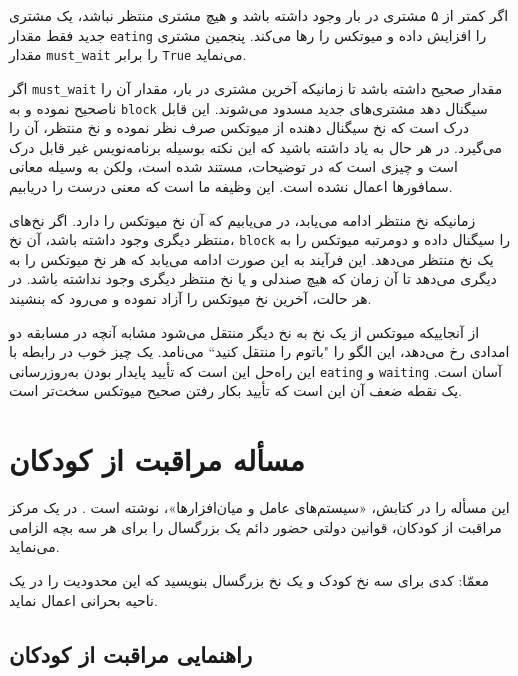 \documentclass{book}
\newcommand{\clearemptydoublepage}{}%
\begin{document}

    اگر کمتر از ۵ مشتری در بار وجود داشته باشد و هیچ مشتری منتظر نباشد، یک مشتری جدید فقط مقدار {\tt eating} را افزایش داده و میوتکس را رها می‌کند. 
    پنجمین مشتری مقدار {\tt must\_wait} را برابر \texttt{True} می‌نماید. 

    اگر {\tt must\_wait} مقدار صحیح داشته باشد تا زمانیکه آخرین مشتری در بار، مقدار آن را ناصحیح نموده و به  {\tt block} سیگنال دهد مشتری‌های جدید 
    مسدود می‌شوند. این قابل درک است که نخ سیگنال دهنده از میوتکس صرف نظر نموده و نخ منتظر، آن را می‌گیرد. در هر حال  به یاد داشته باشید که 
    این نکته بوسیله برنامه‌نویس غیر قابل درک است و چیزی است که در توضیحات، مستند شده است، 
    ولکن به وسیله معانی سمافورها اعمال نشده است. این وظیفه ما است که معنی درست را دریابیم.

    زمانیکه نخ منتظر ادامه می‌یابد، در می‌یابیم که آن نخ میوتکس را دارد. اگر نخ‌های منتظر دیگری وجود داشته باشد، آن نخ، {\tt block} را سیگنال داده و 
    دومرتبه میوتکس را به یک نخ منتظر می‌دهد. این فرآیند به این صورت ادامه می‌یابد که  هر نخ میوتکس را
    به دیگری می‌دهد تا آن زمان که هیچ صندلی و یا نخ منتظر دیگری وجود نداشته باشد. در هر حالت، آخرین نخ میوتکس را آزاد نموده و می‌رود که بنشیند. 
    

    از آنجاییکه میوتکس از یک نخ به نخ دیگر منتقل می‌شود مشابه آنچه در مسابقه دو امدادی رخ می‌دهد، 
    این الگو را "باتوم را منتقل کنید‍‍`` می‌نامد.
    یک چیز خوب در رابطه با این راه‌حل این است که تأیید پایدار بودن به‌روزرسانی  {\tt eating} و {\tt waiting} آسان است. یک نقطه ضعف آن 
    این است که تأیید بکار رفتن صحیح میوتکس سخت‌تر است. 

\section{مسأله مراقبت از کودکان}

    این مسأله را  در کتابش، «سیستم‌های عامل و میان‌افزارها»، نوشته است \cite{hailperin}. 
    در یک مرکز مراقبت از کودکان، قوانین دولتی حضور دائم یک بزرگسال را برای هر سه بچه الزامی می‌نماید. 

    معمّا: کدی برای سه نخ کودک و یک نخ بزرگسال بنویسید که این محدودیت‌ را در یک ناحیه بحرانی اعمال نماید. 

\clearemptydoublepage
\subsection {راهنمایی مراقبت از کودکان}
\end{document}
